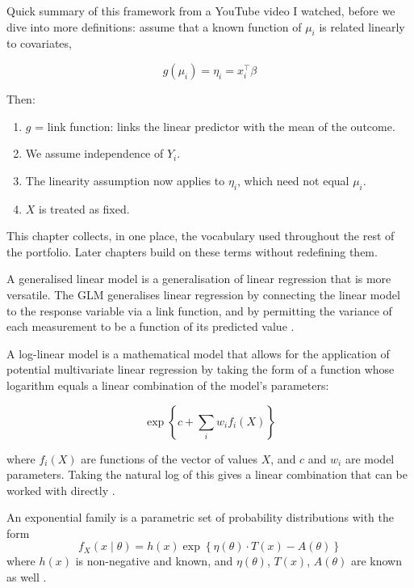 Quick summary of this framework from a YouTube video I watched, before we dive into more definitions: assume that a known function of $\mu_i$ is related linearly to covariates,
\begin{mathbox}
\[
g(\mu_i) = \eta_i = x_i^\top\beta
\]
\end{mathbox}
Then:
\begin{enumerate}
\item $g$ = link function: links the linear predictor with the mean of the outcome.
\item We assume independence of $Y_i$.
\item The linearity assumption now applies to $\eta_i$, which need not equal $\mu_i$.
\item $X$ is treated as fixed.
\end{enumerate}

\Cognition

This chapter collects, in one place, the vocabulary used throughout the rest of the portfolio. Later chapters build on these terms without redefining them.

A generalised linear model is a generalisation of linear regression that is more versatile. The GLM generalises linear regression by connecting the linear model to the response variable via a link function, and by permitting the variance of each measurement to be a function of its predicted value \citep{nelder1972,mccullagh1989}.

A log-linear model is a mathematical model that allows for the application of potential multivariate linear regression by taking the form of a function whose logarithm equals a linear combination of the model's parameters:
\begin{mathbox}
\[
\exp\left\{c + \sum_i w_i f_i(X)\right\}
\]
\end{mathbox}
where $f_i(X)$ are functions of the vector of values $X$, and $c$ and $w_i$ are model parameters. Taking the natural log of this gives a linear combination that can be worked with directly \citep{agresti2015}.

\begin{defbox}
An exponential family is a parametric set of probability distributions with the form
\[
f_X(x \mid \theta) = h(x)\exp\left\{\eta(\theta)\cdot T(x) - A(\theta)\right\}
\]
where $h(x)$ is non-negative and known, and $\eta(\theta)$, $T(x)$, $A(\theta)$ are known as well \citep{mccullagh1989,wikipedia_glm}.
\end{defbox}

